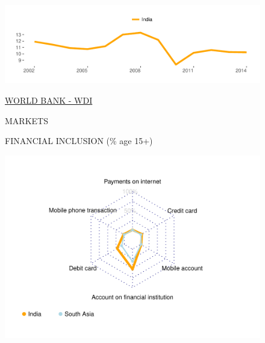 \documentclass{article}\usepackage[]{graphicx}\usepackage[]{color}
\makeatletter
\def\maxwidth{ %
  \ifdim\Gin@nat@width>\linewidth
    \linewidth
  \else
    \Gin@nat@width
  \fi
}
\makeatother
\begin{document}
\begin{figure}
\begin{minipage}[c]{0.95\textwidth}
\begin{minipage}[c]{0.95\textwidth}
\begin{minipage}[c]{0.49\textwidth}
{\centering \includegraphics[width=\maxwidth]{figure/line_chart_Finance2-1} 

}



      \vspace*{-0.2cm} 
      \scriptsize{\href{http://data.worldbank.org}{\textcolor[HTML]{22A6F5}{WORLD BANK - WDI}}}
    \end{minipage}
  \end{minipage}  
  
  \vspace{5ex}
  \begin{minipage}[b]{0.95\textwidth}
    \begin{flushleft}  
      \Large{\textcolor[HTML]{22A6F5}{MARKETS}}
    \end{flushleft}
    \begin{minipage}[c]{0.48\textwidth} %
      \small{\textcolor[HTML]{818181}{FINANCIAL INCLUSION \footnotesize(\% age 15+)}}
      \vspace*{-0.6cm}


{\centering \includegraphics[width=\maxwidth]{figure/radar_chart_Markets-1} 

}
\end{minipage}
\end{minipage}
\end{minipage}
\end{figure}
\end{document}

